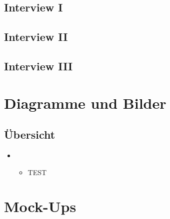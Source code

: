 \documentclass[Bachelorarbeit.tex]{subfiles}
\begin{document}
\section{Interview I}
\newpage
\section{Interview II}
\newpage
\section{Interview III}
\newpage

\chapter{Diagramme und Bilder}
\label{chap:diagramme_und_bilder}




\section{Übersicht}
\begin{itemize} 
\item {}
\begin{itemize}
\item TEST
\end{itemize}



\end{itemize}

\newpage
\chapter*{Mock-Ups}
\label{sec:mock_ups}
\end{document}
